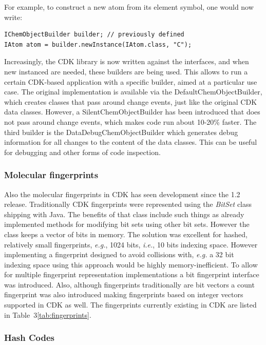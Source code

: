 \documentclass[10pt]{bmcart}
\begin{document}
For example, to construct a new atom from its element symbol, one would now write:

\begin{verbatim}
IChemObjectBuilder builder; // previously defined
IAtom atom = builder.newInstance(IAtom.class, "C");
\end{verbatim}

Increasingly, the CDK library is now written against the interfaces, and when new instanced
are needed, these builders are being used. This allows to run a certain CDK-based
application with a specific builder, aimed at a particular use case. The original
implementation is available via the DefaultChemObjectBuilder, which creates
classes that pass around change events, just like the original CDK data classes.
However, a SilentChemObjectBuilder has been introduced that does not pass around
change events, which makes code run about 10-20\% faster.
The third builder is the DataDebugChemObjectBuilder which generates debug information
for all changes to the content of the data classes. This can be useful for
debugging and other forms of code inspection.

\subsubsection*{Molecular fingerprints}
Also the molecular fingerprints in CDK has seen development since the 1.2
release. Traditionally CDK fingerprints were represented using the
\textit{BitSet} class shipping with Java. The benefits of that class include
such things as already implemented methods for modifying bit sets using other
bit sets. However the class keeps a vector of bits in memory. The solution was
excellent for hashed, relatively small fingerprints, \textit{e.g.}, 1024 bits,
\textit{i.e.}, 10 bits indexing space. However implementing a fingerprint
designed to avoid collisions with, \textit{e.g.} a 32 bit indexing space using
this approach would be highly memory-inefficient. To allow for multiple
fingerprint representation implementations a bit fingerprint interface was
introduced. Also, although fingerprints traditionally are bit vectors a count
fingerprint was also introduced making fingerprints based on integer vectors
supported in CDK as well. The fingerprints currently existing in CDK are listed
in Table~3\ref{tab:fingerprints}.

\subsubsection*{Hash Codes}
\end{document}
